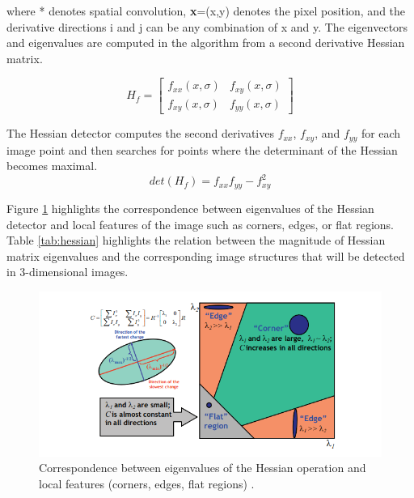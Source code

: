 where * denotes spatial convolution, \textbf{x}=(x,y) denotes the pixel position, and the derivative directions i and j can be any combination of x and y. The eigenvectors and eigenvalues are computed in the algorithm from a second derivative Hessian matrix.

\begin{equation} \label{eqn:hessian}
H_f=
  \begin{bmatrix}
    f_{xx}(x,\sigma) & f_{xy}(x,\sigma) \\
    f_{xy}(x,\sigma) & f_{yy}(x,\sigma)
  \end{bmatrix}
\end{equation}

The Hessian detector computes the second derivatives $f_{xx}$, $f_{xy}$, and $f_{yy}$ for each image point and then searches for points where the determinant of the Hessian becomes maximal.
\begin{equation}
det(H_f)= f_{xx}f_{yy}-f_{xy}^2
\end{equation}

Figure \ref{fig:hessian_app} highlights the correspondence between eigenvalues of the Hessian detector and local features of the image such as corners, edges, or flat regions. Table \ref{tab:hessian} highlights the relation between the magnitude of Hessian matrix eigenvalues and the corresponding image structures that will be detected in 3-dimensional images.

\begin{figure}[H] 
	\centering
	\includegraphics[width=1\textwidth]{hessian_app.png} 
	\caption{Correspondence between eigenvalues of the Hessian operation and local features (corners, edges, flat regions) \citep{grauman2011visual}.}
	\label{fig:hessian_app}
\end{figure}


